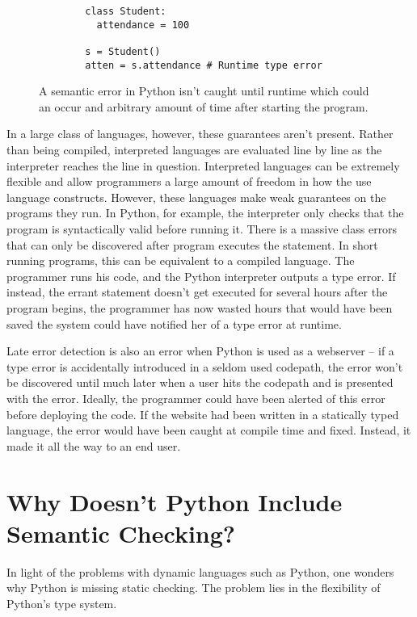 \documentclass{article}[12pt]
\begin{document}
\begin{figure}
    \begin{verbatim}
        class Student:
          attendance = 100

        s = Student()
        atten = s.attendance # Runtime type error
    \end{verbatim}
    \caption{A semantic error in Python isn't caught until runtime which could an occur and
    arbitrary amount of time after starting the program.}
\end{figure}

In a large class of languages, however, these guarantees aren't present. Rather than being compiled,
interpreted languages are evaluated line by line as the interpreter reaches the line in question.
Interpreted languages can be extremely flexible and allow programmers a large amount of freedom in
how the use language constructs. However, these languages make weak guarantees on the programs they
run. In Python, for example, the interpreter only checks that the program is syntactically valid
before running it.  There is a massive class errors that can only be discovered after program
executes the statement. In short running programs, this can be equivalent to a compiled language.
The programmer runs his code, and the Python interpreter outputs a type error. If instead, the
errant statement doesn't get executed for several hours after the program begins, the programmer has
now wasted hours that would have been saved the system could have notified her of a type error at
runtime. 

Late error detection is also an error when Python is used as a webserver -- if a type error is
accidentally introduced in a seldom used codepath, the error won't be discovered until much later
when a user hits the codepath and is presented with the error. Ideally, the programmer could have
been alerted of this error before deploying the code. If the website had been written in a
statically typed language, the error would have been caught at compile time and fixed. Instead, it
made it all the way to an end user.

\section{Why Doesn't Python Include Semantic Checking?}
In light of the problems with dynamic languages such as Python, one wonders why Python is missing
static checking. The problem lies in the flexibility of Python's type system. 
\end{document}

